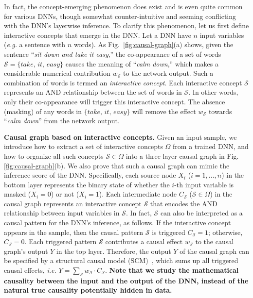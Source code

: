 \documentclass[10pt,twocolumn,letterpaper]{article}
\begin{document}
In fact, the concept-emerging phenomenon does exist and is even quite common for various DNNs, though somewhat counter-intuitive and seeming conflicting with the DNN's layerwise inference.
To clarify this phenomenon, let us first define interactive concepts that emerge in the DNN.
Let a DNN have {\small$n$} input variables (\emph{e.g.} a sentence with {\small$n$} words).
As Fig.~\ref{fig:causal-graph}(a) shows, given the sentence ``\textit{sit down and take it easy},'' the co-appearance of a set of words {\small$\mathcal{S}=\{\textit{take, it, easy}\}$} causes the meaning of ``\textit{calm down},'' which makes a considerable numerical contribution {\small$w_{\mathcal{S}}$} to the network output.
Such a combination of words is termed an \textit{interactive concept}.
Each interactive concept {\small$\mathcal{S}$} represents an AND relationship between the set of words in {\small$\mathcal{S}$}. In other words, only their co-appearance will trigger this interactive concept. 
The absence (masking) of any words in {\small$\{\textit{take, it, easy}\}$} will remove the effect {\small$w_{\mathcal{S}}$} towards ``\textit{calm down}'' from the network output.


\textbf{Causal graph based on interactive concepts.}
Given an input sample, we introduce how to extract a set of interactive concepts {\small$\Omega$} from a trained DNN, and how to organize all such concepts {\small$\mathcal{S}\in\Omega$} into a three-layer causal graph in Fig. \ref{fig:causal-graph}(b).
We also prove that such a causal graph can mimic the inference score of the DNN.
Specifically, each source node {\small$X_i$} ({\small$i=1,...,n$}) in the bottom layer represents the binary state of whether the {\small$i$}-th input variable is masked ({\small$X_i=0$}) or not ({\small$X_i=1$}).
Each intermediate node {\small$C_{\mathcal{S}}$}  ({\small$\mathcal{S}\in\Omega$}) in the causal graph represents an interactive concept {\small$\mathcal{S}$} that encodes the AND relationship between input variables in {\small$\mathcal{S}$}.
In fact, {\small$\mathcal{S}$} can also be interpreted as a causal pattern for the DNN's inference, as follows.
If the interactive concept appears in the sample, then the causal pattern {\small$\mathcal{S}$} is triggered {\small$C_{\mathcal{S}}=1$}; otherwise, {\small$C_{\mathcal{S}}=0$}.
Each triggered pattern {\small$\mathcal{S}$} contributes a causal effect {\small$w_{\mathcal{S}}$} to the causal graph's output {\small$Y$} in the top layer.
Therefore, the output {\small$Y$} of the causal graph can be specified by a structural causal model (SCM)~\cite{pearl2009causality}, which sums up all triggered causal effects, \emph{i.e.} {\small$Y=\sum_{\mathcal{S}} w_{\mathcal{S}}\cdot C_{\mathcal{S}}$}.
\textbf{Note that we study the mathematical causality between the input and the output of the DNN, instead of the natural true causality potentially hidden in data.}
\end{document}
